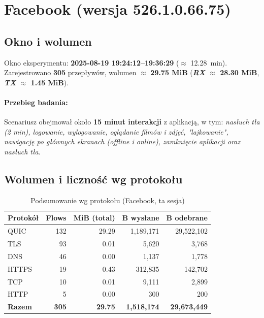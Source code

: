 \section{Facebook (wersja 526.1.0.66.75)}
\label{sec:facebook}

\subsection*{Okno i wolumen}
Okno eksperymentu: \textbf{2025-08-19 19{:}24{:}12–19{:}36{:}29} ($\approx$ \SI{12.28}{\minute}). Zarejestrowano \textbf{305} przepływów, wolumen $\approx$ \textbf{29.75 MiB} (\textbf{\emph{RX} $\approx$ 28.30 MiB}, \textbf{\emph{TX} $\approx$ 1.45 MiB}).

\paragraph{Przebieg badania:} 
Scenariusz obejmował około \textbf{15 minut interakcji} z aplikacją, w tym: 
\emph{nasłuch tła (2 min), logowanie, wylogowanie, oglądanie filmów i zdjęć, "lajkowanie", nawigację po głównych ekranach (offline i online), zamknięcie aplikacji oraz nasłuch tła}.

\subsection{Wolumen i liczność wg protokołu}
\begin{table}[H]
  \centering
  \caption{Podsumowanie wg protokołu (Facebook, ta sesja)}
  \label{tab:fb-proto}
  \begin{tabular}{lrrrr}
    \toprule
    \textbf{Protokół} & \textbf{Flows} & \textbf{MiB (total)} & \textbf{B wysłane} & \textbf{B odebrane} \\
    \midrule
    QUIC  & 132 & 29.29 & 1{,}189{,}171 & 29{,}522{,}102 \\
    TLS   & 93  & 0.01 & 5{,}620   & 3{,}768 \\
    DNS   & 46  & 0.00 & 1{,}137   & 1{,}778 \\
    HTTPS & 19  & 0.43 & 312{,}835 & 142{,}702 \\
    TCP   & 10  & 0.01 & 9{,}111   & 2{,}899 \\
    HTTP  & 5   & 0.00 & 300       & 200 \\
    \midrule
    \textbf{Razem} & \textbf{305} & \textbf{29.75} & \textbf{1{,}518{,}174} & \textbf{29{,}673{,}449} \\
    \bottomrule
  \end{tabular}
\end{table}

